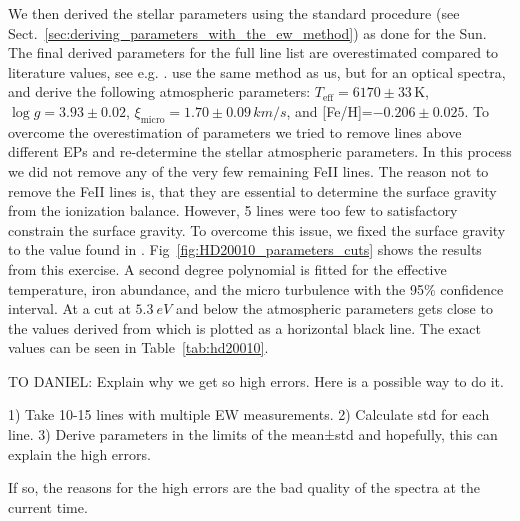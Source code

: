 \documentclass{aa}
\begin{document}
We then derived the stellar parameters using the standard procedure
(see Sect.~\ref{sec:deriving_parameters_with_the_ew_method}) as
done for the Sun. The final derived parameters for the full line
list are overestimated compared to literature values, see e.g.
\citet{Mortier2013,Gonzalez2010}. \cite{Gonzalez2010} use the same
method as us, but for an optical spectra, and derive the following
atmospheric parameters: $T_\mathrm{eff}=6170\pm33\,\si{\kelvin}$,
$\log g=3.93\pm0.02$, $\xi_\mathrm{micro}=1.70\pm0.09\,\si{km/s}$, and
[Fe/H]=$-0.206\pm0.025$. To overcome the overestimation of parameters
we tried to remove lines above different EPs and re-determine the
stellar atmospheric parameters. In this process we did not remove
any of the very few remaining FeII lines. The reason not to remove
the FeII lines is, that they are essential to determine the surface
gravity from the ionization balance. However, 5 lines were too few to
satisfactory constrain the surface gravity. To overcome this issue, we
fixed the surface gravity to the value found in \cite{Gonzalez2010}.
Fig~\ref{fig:HD20010_parameters_cuts} shows the results from this
exercise. A second degree polynomial is fitted for the effective
temperature, iron abundance, and the micro turbulence with the
95\% confidence interval. At a cut at $\SI{5.3}{eV}$ and below
the atmospheric parameters gets close to the values derived from
\cite{Gonzalez2010} which is plotted as a horizontal black line. The
exact values can be seen in Table~\ref{tab:hd20010}.


TO DANIEL:
Explain why we get so high errors. Here is a possible way to do it.

1) Take 10-15 lines with multiple EW measurements.
2) Calculate std for each line.
3) Derive parameters in the limits of the mean±std and hopefully, this can explain the high errors.

If so, the reasons for the high errors are the bad quality of the spectra at the current time.
\end{document}
